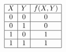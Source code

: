 \documentclass[12pt]{article}
\begin{document}
\begin{displaymath}  
  \begin{array}{|c|c|c|}\hline
    
     X & Y & f(X,Y)    \\\hline
     0 & 0 & 0    \\\hline
     0 & 1 & 0   \\\hline
     1 & 0 & 1   \\\hline
     1 & 1 & 1  \\\hline
  \end{array}
\end{displaymath}
\end{document}
